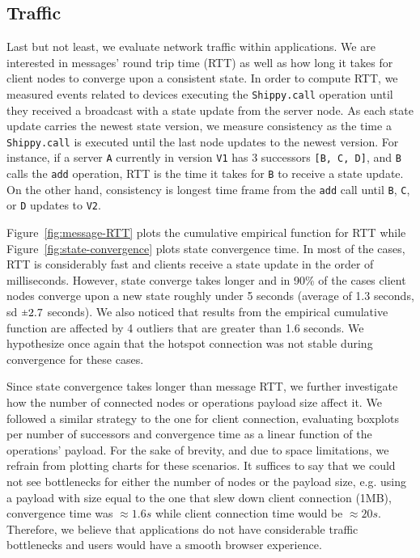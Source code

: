\subsection{Traffic}
\label{sub:eval:traffic}


Last but not least, we evaluate network traffic within \APIshort applications.
We are interested in messages' round trip time (RTT) as well as how long it takes for client nodes to converge upon a consistent state.
In order to compute RTT, we measured events related to devices executing the \texttt{Shippy.call} operation until they received a broadcast with a state update from the server node.
As each state update carries the newest state version, we measure consistency as the time a \texttt{Shippy.call} is executed until the last node updates to the newest version.
For instance, if a server \texttt{A} currently in version \texttt{V1} has 3 successors \texttt{[B, C, D]}, and \texttt{B} calls the \texttt{add} operation, RTT is the time it takes for \texttt{B} to receive a state update.
On the other hand, consistency is longest time frame from the \texttt{add} call until \texttt{B}, \texttt{C}, or \texttt{D} updates to \texttt{V2}.


Figure~\ref{fig:message-RTT} plots the cumulative empirical function for RTT while Figure~\ref{fig:state-convergence} plots state convergence time.
In most of the cases, RTT is considerably fast and clients receive a state update in the order of milliseconds.
However, state converge takes longer and in 90\% of the cases client nodes converge upon a new state roughly under 5 seconds (average of 1.3 seconds, sd $\rpm 2.7$ seconds).
We also noticed that results from the empirical cumulative function are affected by 4 outliers that are greater than 1.6 seconds. We hypothesize once again that the hotspot connection was not stable during convergence for these cases.


Since state convergence takes longer than message RTT, we further investigate how the number of connected nodes or operations payload size affect it.
We followed a similar strategy to the one for client connection, evaluating boxplots per number of successors and convergence time as a linear function of the operations' payload.
For the sake of brevity, and due to space limitations, we refrain from plotting charts for these scenarios.
It suffices to say that we could not see bottlenecks for either the number of nodes or the payload size, e.g. using a payload with size equal to the one that slew down client connection (1MB), convergence time was $\approx 1.6s$ while client connection time would be $\approx 20s$.
Therefore, we believe that \APIshort applications do not have considerable traffic bottlenecks and users would have a smooth browser experience.



